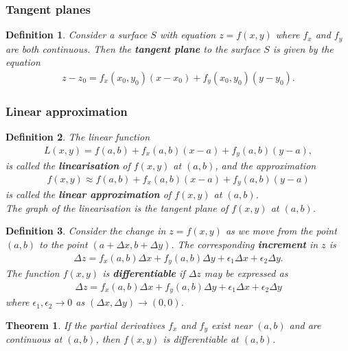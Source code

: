 \documentclass{article}
\theoremstyle{sltheorem}
\newtheorem{definition}{Definition}[section]
\newtheorem{theorem}{Theorem}[section]
\newcommand*\B[1]{\textbf{#1}}
\begin{document}
\subsubsection{Tangent planes}
\begin{definition}
    Consider a surface $S$ with equation $z=f(x,y)$ where $f_x$ and $f_y$
    are both continuous. Then the \B{tangent plane} to the surface $S$
    is given by the equation
    \begin{align*}
        z - z_0 = f_x(x_0, y_0)(x-x_0) + f_y(x_0,y_0)(y-y_0).
    \end{align*}
\end{definition}
\subsubsection{Linear approximation}
\begin{definition}
    The linear function
    \begin{align*}
        L(x,y)=f(a,b)+f_x(a,b)(x-a)+f_y(a,b)(y-a),
    \end{align*}
    is called the \B{linearisation} of $f(x,y)$ at $(a,b)$, and the
    approximation
    \begin{align*}
        f(x,y)\approx f(a,b)+f_x(a,b)(x-a)+f_y(a,b)(y-a)
    \end{align*}
    is called the \B{linear approximation} of $f(x,y)$ at $(a,b)$.\\
    The graph of the linearisation is the tangent plane of $f(x,y)$ at
    $(a,b)$.
\end{definition}
\begin{definition}
    Consider the change in $z=f(x,y)$ as we move from the point
    $(a,b)$ to the point $(a+\Delta x, b+\Delta y)$. The
    corresponding \B{increment} in $z$ is
    \begin{align*}
        \Delta z = f_x(a,b)\Delta x + f_y(a,b)\Delta y 
        + \epsilon_1\Delta x + \epsilon_2\Delta y.
    \end{align*}
    The function $f(x,y)$ is \B{differentiable} if $\Delta z$
    may be expressed as
    \begin{align*}
        \Delta z = f_x(a,b)\Delta x + f_y(a,b)\Delta y
        + \epsilon_1\Delta x + \epsilon_2\Delta y
    \end{align*}
    where $\epsilon_1, \epsilon_2 \to 0$ as 
    $(\Delta x, \Delta y)\to(0,0)$.
\end{definition}
\begin{theorem}
    If the partial derivatives $f_x$ and $f_y$ exist near
    $(a,b)$ and are continuous at $(a,b)$, then $f(x,y)$
    is differentiable at $(a,b)$.
\end{theorem}
\end{document}
